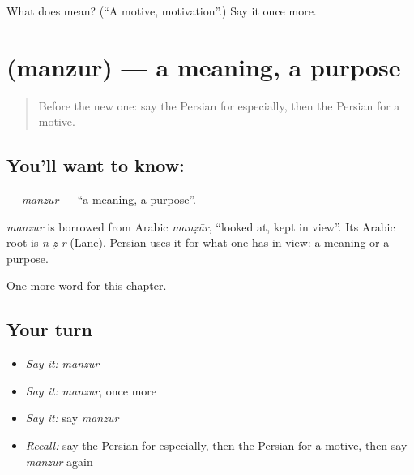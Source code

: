 \begin{tcolorbox}[breakable,colback=teal!4,colframe=teal!35!black,title={Before you move on}]
What does  mean? (\textquotedblleft{}A motive, motivation\textquotedblright{}.) Say it once more.
\end{tcolorbox}
\section[\texorpdfstring{\fa{منظور} (manzur)}{منظور (manzur)}]{ (manzur) — a meaning, a purpose}

\label{lesson:FA-C160-manzur}



\begin{quote}
Before the new one: say the Persian for especially, then the Persian for a motive.
\end{quote}

\subsection*{You'll want to know: }
\textbf{} — \emph{manzur} — \textquotedblleft{}a meaning, a purpose\textquotedblright{}.

\begin{cousinweb}
\emph{manzur} is borrowed from Arabic \emph{manẓūr}, \textquotedblleft{}looked at, kept in view\textquotedblright{}. Its Arabic root is \emph{n-ẓ-r} (Lane). Persian uses it for what one has in view: a meaning or a purpose.
\end{cousinweb}

\begin{grammarlens}[title={What you've built}]
One more word for this chapter.
\end{grammarlens}

\subsection*{Your turn}
\begin{itemize}
\raggedright
  \item \emph{Say it:} \emph{manzur}
  \item \emph{Say it:} \emph{manzur}, once more
  \item \emph{Say it:} say \emph{manzur}
  \item \emph{Recall:} say the Persian for especially, then the Persian for a motive, then say \emph{manzur} again
\end{itemize}

